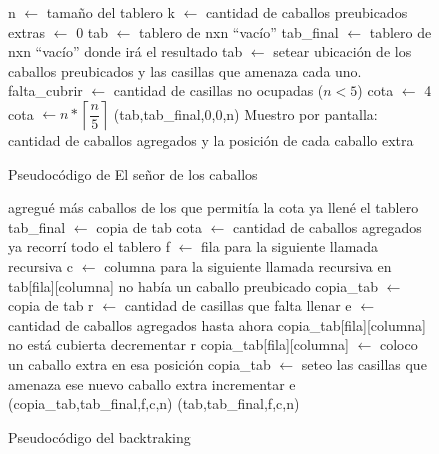 \begin{figure}
\begin{codebox}
\li n $\leftarrow$ tamaño del tablero
\li k $\leftarrow$ cantidad de caballos preubicados
\li extras $\leftarrow$ 0
\li tab $\leftarrow$ tablero de  nxn ``vacío''
\li tab_final $\leftarrow$ tablero de nxn ``vacío'' donde irá el resultado
\li tab $\leftarrow$ setear ubicación de los caballos preubicados y las casillas que amenaza cada uno.
\li falta_cubrir $\leftarrow$ cantidad de casillas no ocupadas 
\li \If ($n < 5$)
\li \Then cota $\leftarrow$ 4
\li \Else cota $\leftarrow n*\left \lceil \dfrac{n}{5} \right \rceil$
	\End
{}(tab,tab_final,0,0,n)
\li Muestro por pantalla: cantidad de caballos agregados y la posición de cada caballo extra
\end{codebox}
\caption{Pseudocódigo de El señor de los caballos}\label{code:caballos}
\end{figure}
\FloatBarrier

\begin{figure}[!ht]
\begin{codebox}
\li \If agregué más caballos de los que permitía la cota
\li \Then \Return   
	\End
\li \If ya llené el tablero
\li \Then tab_final $\leftarrow$ copia de tab
\li 		 cota $\leftarrow$ cantidad de caballos agregados 
\li 		\Return
	\End
\li \If ya recorrí todo el tablero
\li \Then \Return
	\End
\li f $\leftarrow$ fila para la siguiente llamada recursiva
\li c $\leftarrow$ columna para la siguiente llamada recursiva 
\li \If en tab[fila][columna] no había un caballo preubicado
\li \Then copia_tab $\leftarrow$ copia de tab
\li 		 r $\leftarrow$ cantidad de casillas que falta llenar
\li		 e $\leftarrow$ cantidad de caballos agregados hasta ahora
\li 		\If copia_tab[fila][columna] no está cubierta
\li 		\Then decrementar r
		\End
\li 		copia_tab[fila][columna] $\leftarrow$ coloco un caballo extra en esa posición
\li		copia_tab $\leftarrow$ seteo las casillas que amenaza ese nuevo caballo extra
\li 		incrementar e
(copia_tab,tab_final,f,c,n)
		\End
{}(tab,tab_final,f,c,n)
\end{codebox}
\caption{Pseudocódigo del backtraking}\label{code:backtraking}
\end{figure}




